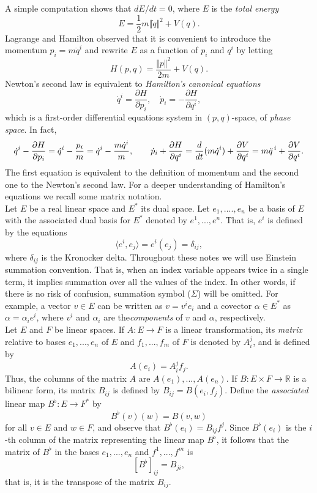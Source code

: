 A simple computation shows that $dE/dt=0$, where $E$ is the \emph{total energy}
$$
E=\frac{1}2m\Vert \dot q\Vert^2+V(q).
$$
Lagrange and Hamilton observed that it is convenient to introduce the momentum $p_i=m\dot q^i$ and rewrite $E$ as a function of $p_i$ and $q^i$ by letting
$$
H(p,q)=\frac{\Vert p\Vert^2}{2m}+V(q).
$$
Newton's second law is equivalent to \emph{Hamilton's canonical equations}
$$
\dot q^i=\frac{\partial H}{\partial p_i},\quad \dot p_i=-\frac{\partial H}{\partial q^i},
$$
which is a first-order differential equations system in $(p,q)$-space, of \emph{phase space}. In fact,
$$
\dot q^i-\frac{\partial H}{\partial p_i}=\dot q^i-\frac{p_i}m=\dot q^i-\frac{m\dot q^i}m,\qquad \dot p_i+\frac{\partial H}{\partial q^i}=\frac{d}{dt}(m\dot q^i)+\frac{\partial V}{\partial q^i}=m\ddot q^{\thinspace i}+\frac{\partial V}{\partial q^i}.
$$
The first equation is equivalent to the definition of momentum and the second one to the Newton's second law. For a deeper understanding of Hamilton's equations we recall some matrix notation. \\

Let $E$ be a real linear space and $E^\ast$ its dual space. Let $e_1,....,e_n$ be a basis of $E$ with the associated dual basis for $E^\ast$ denoted by $e^1,...,e^n$. That is, $e^i$ is defined by the equations
$$
\langle e^i, e_j\rangle=e^i(e_j)=\delta_{ij},
$$
where $\delta_{ij}$ is the Kronocker delta. Throughout these notes we will use Einstein summation convention. That is, when an index variable appears twice in a single term, it implies summation over all the values of the index. In other words, if there is no risk of confusion, summation symbol ($\Sigma$) will be omitted. For example, a vector $v\in E$ can be written as $v=v^ie_i$ and a covector $\alpha\in E^\ast$ as $\alpha=\alpha_ie^i$, where $v^i$ and $\alpha_i$ are the\emph{components} of $v$ and $\alpha$, respectively.\\

Let $E$ and $F$ be linear spaces. If $A:E\to F$ is a linear transformation, its \emph{matrix} relative to bases $e_1,...,e_n$ of $E$ and $f_1,...,f_m$ of $F$ is denoted by $A_i^j$, and is defined by
$$
A(e_i)=A_i^j f_j.
$$
Thus, the columns of the matrix $A$ are $A(e_1),...,A(e_n)$. If $B:E\times F\to \mathbb R$ is a bilinear form, its matrix $B_{ij}$ is defined by $B_{ij}=B(e_i, f_j)$. Define the \emph{associated} linear map $B^\flat:E\to F^\ast$ by
$$
B^\flat(v)(w)=B(v,w)
$$
for all $v\in E$ and $w\in F$, and observe that $B^\flat(e_i)=B_{ij}f^j$. Since $B^\flat(e_i)$ is the $i$-th column of the matrix representing the linear map $B^\flat$, it follows that the matrix of $B^\flat$ in the bases $e_1,...,e_n$ and $f^1,...,f^m$ is
$$
[B^\flat]_{ij}=B_{ji},
$$
that is, it is the transpose of the matrix $B_{ij}$.\\

